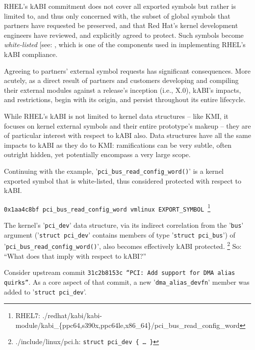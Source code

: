 \documentclass[10pt,oneside,english]{book}
\begin{document}
RHEL's kABI commitment does not cover all exported symbols but rather
is limited to, and thus only concerned with, the subset of global
symbols that partners have requested be preserved, and that Red Hat's
kernel development engineers have reviewed, and explicitly agreed
to protect. Such symbols become \emph{white-listed }{[}see: \nameref{chap:kABI-Lists}{]},
which is one of the components used in implementing RHEL's kABI compliance.

Agreeing to partners' external symbol requests has significant consequences.
More acutely, as a direct result of partners and customers developing
and compiling their external modules against a release's inception
(i.e., X.0), kABI's impacts, and restrictions, begin with its origin,
and persist throughout its entire lifecycle.

While RHEL's kABI is not limited to kernel data structures -- like
KMI, it focuses on kernel external symbols and their entire prototype's
makeup -- they are of particular interest with respect to kABI also.
Data structures have all the same impacts to kABI as they do to KMI:
ramifications can be very subtle, often outright hidden, yet potentially
encompass a very large scope.

Continuing with the example, '\texttt{pci\_bus\_read\_config\_word()}'
is a kernel exported symbol that is white-listed, thus considered
protected with respect to kABI.

\texttt{\footnotesize{}0x1aa4c8bf pci\_bus\_read\_config\_word vmlinux
EXPORT\_SYMBOL}\texttt{ }\footnote{RHEL7: ./redhat/kabi/kabi-module/kabi\_\{ppc64,s390x,ppc64le,x86\_64\}/pci\_bus\_read\_config\_word}

The kernel's '\texttt{pci\_dev}' data structure, via its indirect
correlation from the '\texttt{bus}' argument ('\texttt{struct pci\_dev}'
contains members of type '\texttt{struct pci\_bus}') of '\texttt{pci\_bus\_read\_config\_word()}',
also becomes effectively kABI protected. \footnote{./include/linux/pci.h: \texttt{struct pci\_dev \{ … \}}}
So: ``What does that imply with respect to kABI?''

Consider upstream commit \texttt{31c2b8153c ``PCI: Add support for
DMA alias quirks''}. As a core aspect of that commit, a new '\texttt{dma\_alias\_devfn}'
member was added to '\texttt{struct pci\_dev}'.
\end{document}
